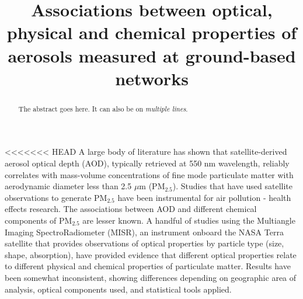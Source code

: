 \documentclass[, manuscript]{copernicus}
\begin{document}
\title{Associations between optical, physical and chemical properties of
aerosols measured at ground-based networks}














\received{}
\pubdiscuss{} %
\revised{}
\accepted{}
\published{}




\maketitle


\begin{abstract}
The abstract goes here. It can also be on \emph{multiple lines}.
\end{abstract}




\introduction

\textless{}\textless{}\textless{}\textless{}\textless{}\textless{}\textless{}
HEAD A large body of literature has shown that satellite-derived aerosol
optical depth (AOD), typically retrieved at 550 nm wavelength, reliably
correlates with mass-volume concentrations of fine mode particulate
matter with aerodynamic diameter less than 2.5 \(\mu\)m (PM\(_{2.5}\)).
Studies that have used satellite observations to generate PM\(_{2.5}\)
have been instrumental for air pollution - health effects research. The
associations between AOD and different chemical components of
PM\(_{2.5}\) are lesser known. A handful of studies using the Multiangle
Imaging SpectroRadiometer (MISR), an instrument onboard the NASA Terra
satellite that provides observations of optical properties by particle
type (size, shape, absorption), have provided evidence that different
optical properties relate to different physical and chemical properties
of particulate matter. Results have been somewhat inconsistent, showing
differences depending on geographic area of analysis, optical components
used, and statistical tools applied.
\end{document}

